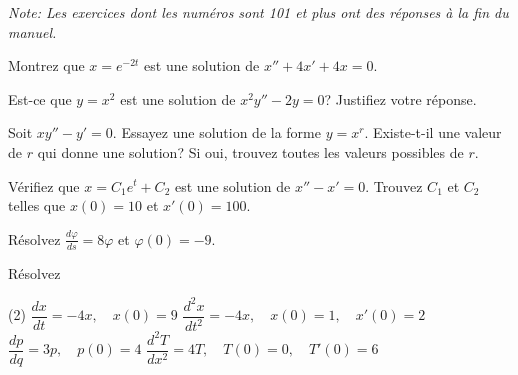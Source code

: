 \noindent
\emph{Note: Les exercices dont les numéros sont 101 et plus ont des réponses à la fin du manuel.}


\setcounter{exercise}{100}

\begin{exercise}
	Montrez que $x = e^{-2t}$ est une solution de $x'' + 4x' + 4x = 0$.
\end{exercise}

\begin{exercise}
	Est-ce que $y = x^2$ est une solution de $x^2y'' - 2y = 0$?  Justifiez votre réponse.
\end{exercise}

\begin{exercise}
	Soit $xy'' - y' = 0$.  Essayez une solution de la forme $y = x^r$.  
	Existe-t-il une valeur de $r$ qui donne une solution?  
	Si oui, trouvez toutes les valeurs possibles de $r$.
\end{exercise}


\begin{exercise}
	Vérifiez que $x=C_1e^t+C_2$ est une solution de $x''-x' = 0$.  
	Trouvez $C_1$ et $C_2$ telles que $x(0) = 10$ et $x'(0) = 100$.
\end{exercise}

\begin{exercise}
	Résolvez $\frac{d\varphi}{ds} = 8 \varphi$ et $\varphi(0) = -9$.
\end{exercise}

\begin{exercise}
	Résolvez
	\begin{tasks}(2)
	\task $\dfrac{dx}{dt} = -4x, \quad x(0)=9$
	\task $\dfrac{d^2x}{dt^2} = -4x, \quad x(0)=1, \quad x'(0)=2$
	\task $\dfrac{dp}{dq} = 3 p, \quad p(0)=4$
	\task $\dfrac{d^2T}{dx^2} = 4 T, \quad T(0)=0, \quad T'(0)=6$
	\end{tasks}
\end{exercise}


